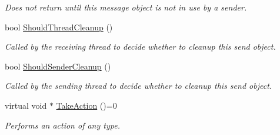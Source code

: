 \begin{DoxyCompactItemize}
\begin{DoxyCompactList}\small\item\em Does not return until this message object is not in use by a sender. \item\end{DoxyCompactList}\item 
bool \hyperlink{class_thread_message_item_a1e1b939947f56a56e47b4e31f009ed5e}{ShouldThreadCleanup} ()
\begin{DoxyCompactList}\small\item\em Called by the receiving thread to decide whether to cleanup this send object. \item\end{DoxyCompactList}\item 
bool \hyperlink{class_thread_message_item_a8835cc0249caaaa291ef75b2dc653b3f}{ShouldSenderCleanup} ()
\begin{DoxyCompactList}\small\item\em Called by the sending thread to decide whether to cleanup this send object. \item\end{DoxyCompactList}\item 
virtual void $\ast$ \hyperlink{class_thread_message_item_ae09a47834e313524b19700ebc92b0dfe}{TakeAction} ()=0
\begin{DoxyCompactList}\small\item\em Performs an action of any type. \item\end{DoxyCompactList}\end{DoxyCompactItemize}
